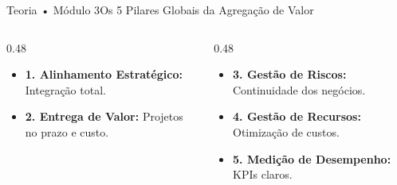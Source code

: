 \begin{senaiframe}{Teoria • Módulo 3}{Os 5 Pilares Globais da Agregação de Valor}
  \begin{columns}[t]
    \begin{column}{0.48\textwidth}
      \begin{tcolorbox}[senaibluecard, title={Estratégia \& Benefícios}]
        \begin{itemize}
          \item \textbf{1. Alinhamento Estratégico:} Integração total.
          \item \textbf{2. Entrega de Valor:} Projetos no prazo e custo.
        \end{itemize}
      \end{tcolorbox}
    \end{column}
    \begin{column}{0.48\textwidth}
      \begin{tcolorbox}[senaiambercard, title={Riscos, Recursos \& Métricas}]
        \begin{itemize}
          \item \textbf{3. Gestão de Riscos:} Continuidade dos negócios.
          \item \textbf{4. Gestão de Recursos:} Otimização de custos.
          \item \textbf{5. Medição de Desempenho:} KPIs claros.
        \end{itemize}
      \end{tcolorbox}
    \end{column}
  \end{columns}
\end{senaiframe}

